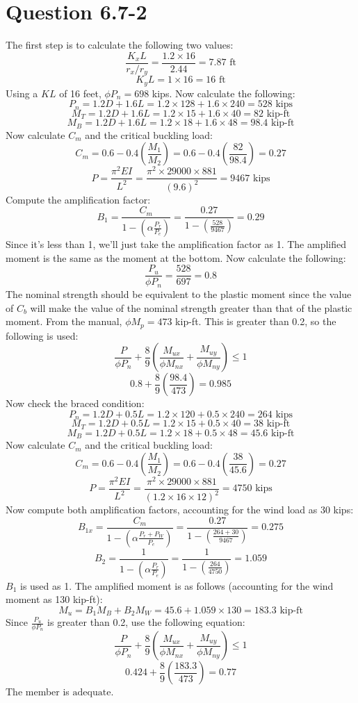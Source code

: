 \documentclass{article}
\begin{document}
\section*{Question 6.7-2}
The first step is to calculate the following two values: 
\[\frac{K_xL}{r_x/r_y}=\frac{1.2\times 16}{2.44}=7.87\text{ ft}\]
\[K_yL=1\times 16=16\text{ ft}\]
Using a $KL$ of 16 feet, $\phi P_n=698$ kips. Now calculate the following: 
\[P_n = 1.2D+1.6L=1.2\times 128 + 1.6\times 240=528 \text{ kips}\] 
\[M_T = 1.2D+1.6L = 1.2\times 15+1.6\times 40=82\text{ kip-ft}\] 
\[M_B = 1.2D+1.6L = 1.2\times 18+1.6\times 48=98.4\text{ kip-ft}\] 
Now calculate $C_m$ and the critical buckling load: 
\[C_m=0.6-0.4\left(\frac{M_1}{M_2}\right)=0.6-0.4\left(\frac{82}{98.4}\right)=0.27\]
\[P=\frac{\pi^2EI}{L^2}=\frac{\pi^2\times 29000\times 881}{(9.6)^2}=9467\text{ kips}\] 
Compute the amplification factor:
\[B_{1}=\frac{C_m}{1-\left(\alpha\frac{P_r}{P_e}\right)}=\frac{0.27}{1-\left(\frac{528}{9467}\right)}=0.29\] 
Since it's less than 1, we'll just take the amplification factor as 1. The amplified moment is the same as the moment at the bottom. Now calculate the following: 
\[\frac{P_u}{\phi P_n}=\frac{528}{697}=0.8\] 
The nominal strength should be equivalent to the plastic moment since the value of $C_b$ will make the value of the nominal strength greater than that of the plastic moment. From the manual, $\phi M_p=473$ kip-ft. This is greater than 0.2, so the following is used: 
\[\frac{P}{\phi P_n}+\frac{8}{9}\left(\frac{M_{ux}}{\phi M_{nx}}+\frac{M_{uy}}{\phi M_{ny}}\right) \leq 1\]
\[0.8+\frac{8}{9}\left(\frac{98.4}{473}\right)=0.985\]
Now check the braced condition: 
\[P_n=1.2D+0.5L=1.2\times 120+0.5\times 240=264\text{ kips}\] 
\[M_T=1.2D+0.5L=1.2\times 15+0.5\times 40=38\text{ kip-ft}\] 
\[M_B=1.2D+0.5L=1.2\times 18+0.5\times 48=45.6\text{ kip-ft}\] 
Now calculate $C_m$ and the critical buckling load:
\[C_m=0.6-0.4\left(\frac{M_1}{M_2}\right)=0.6-0.4\left(\frac{38}{45.6}\right)=0.27\]
\[P=\frac{\pi^2EI}{L^2}=\frac{\pi^2\times 29000\times 881}{(1.2\times 16\times 12)^2}=4750\text{ kips}\]
Now compute both amplification factors, accounting for the wind load as 30 kips:
\[B_{1x}=\frac{C_m}{1-\left(\alpha\frac{P_r+P_W}{P_e}\right)}=\frac{0.27}{1-\left(\frac{264+30}{9467}\right)}=0.275\] 
\[B_2=\frac{1}{1-\left(\alpha\frac{P_r}{P_e}\right)}=\frac{1}{1-\left(\frac{264}{4750}\right)}=1.059\]
$B_1$ is used as 1. The amplified moment is as follows (accounting for the wind moment as 130 kip-ft): 
\[M_u=B_1M_B+B_2M_W=45.6+1.059\times 130=183.3\text{ kip-ft}\] 
Since $\frac{P_u}{\phi P_n}$ is greater than 0.2, use the following equation: 
\[\frac{P}{\phi P_n}+\frac{8}{9}\left(\frac{M_{ux}}{\phi M_{nx}}+\frac{M_{uy}}{\phi M_{ny}}\right) \leq 1\]
\[0.424+\frac{8}{9}\left(\frac{183.3}{473}\right)=0.77\]
The member is $\boxed{\text{adequate}}$.
\end{document}
